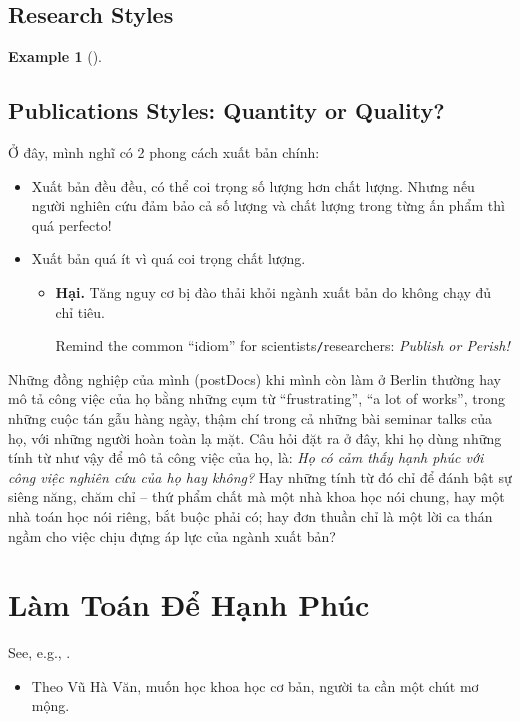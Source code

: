 \documentclass{article}
\numberwithin{equation}{section}
\newtheorem{example}{Example}[section]
\begin{document}
\subsection{Research Styles}
\begin{example}[\cite{VNE/PHH}]
	
\end{example}

\subsection{Publications Styles: Quantity or Quality?}
Ở đây, mình nghĩ có 2 phong cách xuất bản chính:
\begin{itemize}
	\item Xuất bản đều đều, có thể coi trọng số lượng hơn chất lượng. Nhưng nếu người nghiên cứu đảm bảo cả số lượng và chất lượng trong từng ấn phẩm thì quá perfecto!
	\item Xuất bản quá ít vì quá coi trọng chất lượng.
	\begin{itemize}
		\item \textbf{Hại.} Tăng nguy cơ bị đào thải khỏi ngành xuất bản do không chạy đủ chỉ tiêu.
		
		Remind the common ``idiom'' for scientists\texttt{/}researchers: \textit{Publish or Perish!}
	\end{itemize}
\end{itemize}
Những đồng nghiệp của mình (postDocs) khi mình còn làm ở Berlin thường hay mô tả công việc của họ bằng những cụm từ ``frustrating'', ``a lot of works'', trong những cuộc tán gẫu hàng ngày, thậm chí trong cả những bài seminar talks của họ, với những người hoàn toàn lạ mặt. Câu hỏi đặt ra ở đây, khi họ dùng những tính từ như vậy để mô tả công việc của họ, là: \textit{Họ có cảm thấy hạnh phúc với công việc nghiên cứu của họ hay không?} Hay những tính từ đó chỉ để đánh bật sự siêng năng, chăm chỉ -- thứ phẩm chất mà một nhà khoa học nói chung, hay một nhà toán học nói riêng, bắt buộc phải có; hay đơn thuần chỉ là một lời ca thán ngầm cho việc chịu đựng áp lực của ngành xuất bản?

\section{Làm Toán Để Hạnh Phúc}
See, e.g., \cite{TN/VHV}.
\begin{itemize}
	\item Theo Vũ Hà Văn, muốn học khoa học cơ bản, người ta cần một chút mơ mộng.
\end{itemize}
\end{document}
